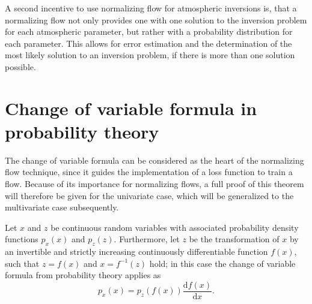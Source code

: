 \documentclass[a4paper,12pt]{report}
\begin{document}
A second incentive to use normalizing flow for atmospheric inversions is, that a normalizing flow not only provides one with one solution to the inversion problem for each atmospheric parameter, but rather with a probability distribution for each parameter. This allows for error estimation and the determination of the most likely solution to an inversion problem, if there is more than one solution possible.

\section{Change of variable formula in probability theory}
The change of variable formula can be considered as the heart of the normalizing flow technique, since it guides the implementation of a loss function to train a flow. Because of its importance for normalizing flows, a full proof of this theorem will therefore be given for the univariate case, which will be generalized to the multivariate case subsequently.
\begin{tm}
Let $x$ and $z$ be continuous random variables with associated probability density functions $p_x(x)$ and $p_z(z)$. Furthermore, let $z$ be the transformation of $x$ by an invertible and strictly increasing continuously differentiable function $f(x)$, such that $z=f(x)$ and $x = f^{-1}(z)$ hold; in this case the change of variable formula from probability theory applies as \begin{equation}
p_x(x) = p_z(f(x))\frac{\mathrm{d}f(x)}{\mathrm{d}x}.
\end{equation}
\end{tm}
\end{document}
